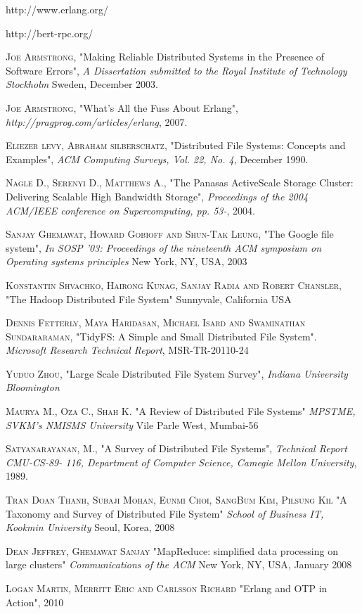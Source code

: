 \documentclass[a4paper,12pt]{article}
\begin{document}
\begin{thebibliography}{99}
  http://www.erlang.org/

  http://bert-rpc.org/

  \textsc{Joe Armstrong},
  "Making Reliable Distributed Systems in the Presence of Software Errors",
  \emph{A Dissertation submitted to the Royal Institute of Technology Stockholm}
  Sweden, December 2003.

  \textsc{Joe Armstrong},
  "What's All the Fuss About Erlang",
  \emph{http://pragprog.com/articles/erlang},
  2007.

  \textsc{Eliezer levy, Abraham silberschatz},
  "Distributed File Systems: Concepts and Examples",
  \emph{ACM Computing Surveys, Vol. 22, No. 4},
  December 1990.

  \textsc{Nagle D., Serenyi D., Matthews A.},
  "The Panasas ActiveScale Storage Cluster: Delivering Scalable High Bandwidth Storage",
  \emph{Proceedings of the 2004 ACM/IEEE conference on Supercomputing, pp. 53-},
  2004.

  \textsc{Sanjay Ghemawat, Howard Gobioff and Shun-Tak Leung},
  "The Google file system",
  \emph{In SOSP '03: Proceedings of the nineteenth ACM symposium on Operating systems principles}
  New York, NY, USA, 2003

  \textsc{Konstantin Shvachko, Hairong Kunag, Sanjay Radia and Robert Chansler},
  "The Hadoop Distributed File System"
  Sunnyvale, California USA

  \textsc{Dennis Fetterly, Maya Haridasan, Michael Isard and Swaminathan Sundararaman},
  "TidyFS: A Simple and Small Distributed File System".
  \emph{Microsoft Research Technical Report},
  MSR-TR-20110-24

  \textsc{Yuduo Zhou},
  "Large Scale Distributed File System Survey",
  \emph{Indiana University Bloomington}

  \textsc{Maurya M., Oza C., Shah K.}
  "A Review of Distributed File Systems"
  \emph{MPSTME, SVKM's NMISMS University}
  Vile Parle West, Mumbai-56

  \textsc{Satyanarayanan, M.},
  "A Survey of Distributed File Systems",
  \emph{Technical Report CMU-CS-89- 116, Department of Computer Science, Camegie Mellon University},
  1989.

  \textsc{Tran Doan Thanh, Subaji Mohan, Eunmi Choi, SangBum Kim, Pilsung Kil}
  "A Taxonomy and Survey of Distributed File System"
  \emph{School of Business IT, Kookmin University}
  Seoul, Korea, 2008

  \textsc{Dean Jeffrey, Ghemawat Sanjay}
  "MapReduce: simplified data processing on large clusters"
  \emph{Communications of the ACM}
  New York, NY, USA, January 2008

  \textsc{Logan Martin, Merritt Eric and Carlsson Richard}
  "Erlang and OTP in Action",
  2010
\end{thebibliography}
\end{document}
